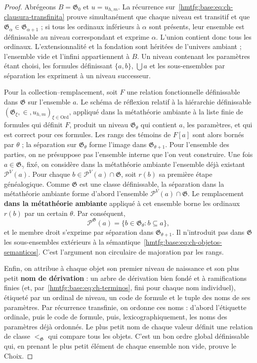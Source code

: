 \begin{proof}
Abrégeons \(B=\mathfrak G_0\) et \(u=u_{h,m}\). La récurrence sur~\eqref{hmtfg:base:eq:ch-clausura-transfinita} prouve simultanément que chaque niveau est transitif et que \(\mathfrak G_\alpha\in\mathfrak G_{\alpha+1}\) ; si tous les ordinaux inférieurs à \(\alpha\) sont présents, leur ensemble est définissable au niveau correspondant et exprime \(\alpha\). L'union contient donc tous les ordinaux. L'extensionnalité et la fondation sont héritées de l'univers ambiant ; l'ensemble vide et l'infini appartiennent à \(B\). Un niveau contenant les paramètres étant choisi, les formules définissant \(\{a,b\}\), \(\bigcup a\) et les sous-ensembles par séparation les expriment à un niveau successeur.

Pour la collection--remplacement, soit \(F\) une relation fonctionnelle définissable dans \(\mathfrak G\) sur l'ensemble \(a\). Le schéma de réflexion relatif à la hiérarchie définissable \((\mathfrak G_\xi,\in,u_{h,m})_{\xi\in\mathrm{Ord}}\), appliqué dans la métathéorie ambiante à la liste finie de formules qui définit \(F\), produit un niveau \(\mathfrak G_\theta\) qui contient \(a\), les paramètres, et qui est correct pour ces formules. Les rangs des témoins de \(F[a]\) sont alors bornés par \(\theta\) ; la séparation sur \(\mathfrak G_\theta\) forme l'image dans \(\mathfrak G_{\theta+1}\). Pour l'ensemble des parties, on ne présuppose pas l'ensemble interne que l'on veut construire. Une fois \(a\in\mathfrak G_\gamma\) fixé, on considère dans la métathéorie ambiante l'ensemble déjà existant \(\mathcal P^V(a)\). Pour chaque \(b\in\mathcal P^V(a)\cap\mathfrak G\), soit \(r(b)\) sa première étape généalogique. Comme \(\mathfrak G\) est une classe définissable, la séparation dans la métathéorie ambiante forme d'abord l'ensemble \(\mathcal P^V(a)\cap\mathfrak G\). Le remplacement \textbf{dans la métathéorie ambiante} appliqué à cet ensemble borne les ordinaux \(r(b)\) par un certain \(\theta\). Par conséquent,
\[
 \mathcal P^{\mathfrak G}(a)
 =\{b\in\mathfrak G_\theta:b\subseteq a\},
\]
et le membre droit s'exprime par séparation dans \(\mathfrak G_{\theta+1}\). Il n'introduit pas dans \(\mathfrak G\) les sous-ensembles extérieurs à la sémantique~\eqref{hmtfg:base:eq:ch-objetos-semanticos}. C'est l'argument non circulaire de majoration par les rangs.

Enfin, on attribue à chaque objet son premier niveau de naissance et son
plus petit \textbf{nom de dérivation} : un arbre de dérivation bien fondé et
à ramifications finies (et, par~\eqref{hmtfg:base:eq:ch-terminos}, fini pour chaque nom individuel), étiqueté par un
ordinal de niveau, un code de formule et le tuple des noms de ses paramètres.
Par récurrence transfinie, on ordonne ces noms : d’abord l’étiquette ordinale,
puis le code de formule, puis, lexicographiquement, les noms des
paramètres déjà ordonnés. Le plus petit nom de chaque valeur définit une relation de
classe \(<_{\mathfrak G}\) qui compare tous les objets. C’est un bon ordre
global définissable qui, en prenant le plus petit élément de chaque ensemble non vide,
prouve le Choix.
\end{proof}


